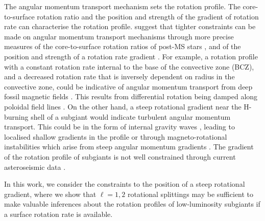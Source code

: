 
The angular momentum transport mechanism sets the rotation profile. The core-to-surface rotation ratio and the position and strength of the gradient of rotation rate can characterise the rotation profile. \citet{fellay_asteroseismology_2021} suggest that tighter constraints can be made on angular momentum transport mechanisms through more precise measures of the core-to-surface rotation ratios of post-MS stars \citep{deheuvels_seismic_2014}, and of the position and strength of a rotation rate gradient \citep{di_mauro_rotational_2018}. For example, a rotation profile with a constant rotation rate internal to the base of the convective zone (BCZ), and a decreased rotation rate that is inversely dependent on radius in the convective zone, could be indicative of angular momentum transport from deep fossil magnetic fields \citep{gough_effect_1990,kissin_rotation_2015,takahashi_modeling_2021}. This results from differential rotation being damped along poloidal field lines \citep{garaud_rotationally_2002, strugarek_magnetic_2011}. On the other hand, a steep rotational gradient near the H-burning shell of a subgiant would indicate turbulent angular momentum transport. This could be in the form of internal gravity waves \citep{pincon_can_2017}, leading to localised shallow gradients in the profile \citep{charbonnel_influence_2005} or through magneto-rotational instabilities which arise from steep angular momentum gradients \citep{spada_angular_2016,balbus_stability_1994,arlt_differential_2003,menou_magnetorotational_2006}. The gradient of the rotation profile of subgiants is not well constrained through current asteroseismic data \citep{deheuvels_seismic_2014}. 

In this work, we consider the constraints to the position of a steep rotational gradient, where we show that $\ell = 1,2$ rotational splittings may be sufficient to make valuable inferences about the rotation profiles of low-luminosity subgiants if a  surface rotation rate is available.

